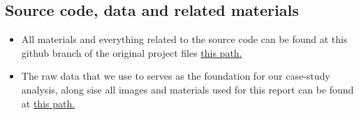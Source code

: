 \documentclass[a4paper]{article}
\begin{document}
    \subsection{Source code, data and related materials}
    \begin{itemize}
        \item All materials and everything related to the source code can be found at this github branch of the original project files \href{https://github.com/NgocMinhUniversityProjects/MM241-Assignment}{this path.}
        \item The raw data that we use to serves as the foundation for our case-study analysis, along sise all images and materials used for this report can be found at \href{https://drive.google.com/drive/folders/1OHjhVcdQswM6GQm5XlXxvGm6hEE0m3ZU?usp=sharing}{this path.}
    \end{itemize}

    
    
    \pagebreak
    \nocite{*}
    \printbibliography[
        heading=bibintoc,
        title={References}
    ]
    
\end{document}
